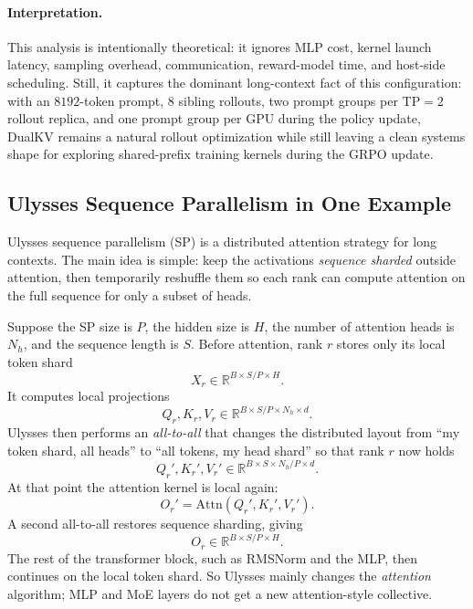 \documentclass[11pt]{article}
\begin{document}
\paragraph{Interpretation.}
This analysis is intentionally theoretical: it ignores MLP cost, kernel launch
latency, sampling overhead, communication, reward-model time, and host-side
scheduling. Still, it captures the dominant long-context fact of this
configuration: with an $8192$-token prompt, $8$ sibling rollouts, two prompt
groups per TP$=2$ rollout replica, and one prompt group per GPU during the
policy update, DualKV remains a natural rollout optimization while still
leaving a clean systems shape for exploring shared-prefix training kernels
during the GRPO update.


\subsection{Ulysses Sequence Parallelism in One Example}

Ulysses sequence parallelism (SP) is a distributed attention strategy for long
contexts. The main idea is simple: keep the activations \emph{sequence sharded}
outside attention, then temporarily reshuffle them so each rank can compute
attention on the full sequence for only a subset of heads.

Suppose the SP size is $P$, the hidden size is $H$, the number of attention
heads is $N_h$, and the sequence length is $S$. Before attention, rank $r$
stores only its local token shard
\[
X_r \in \mathbb{R}^{B \times S/P \times H}.
\]
It computes local projections
\[
Q_r, K_r, V_r \in \mathbb{R}^{B \times S/P \times N_h \times d}.
\]
Ulysses then performs an \emph{all-to-all} that changes the distributed layout
from ``my token shard, all heads'' to ``all tokens, my head shard'' so that
rank $r$ now holds
\[
Q_r', K_r', V_r' \in \mathbb{R}^{B \times S \times N_h/P \times d}.
\]
At that point the attention kernel is local again:
\[
O_r' = \mathrm{Attn}(Q_r', K_r', V_r').
\]
A second all-to-all restores sequence sharding, giving
\[
O_r \in \mathbb{R}^{B \times S/P \times H}.
\]
The rest of the transformer block, such as RMSNorm and the MLP, then continues
on the local token shard. So Ulysses mainly changes the \emph{attention}
algorithm; MLP and MoE layers do not get a new attention-style collective.
\end{document}
